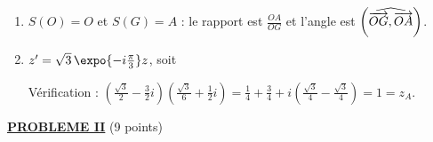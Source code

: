 \begin{description}
\begin{enumerate}
\begin{enumerate}
			\item {}
				$S(O) = O$ et $S(G) = A$ : le rapport est $\frac{OA}{OG}$ et l'angle est $\left( \widehat{ \overrightarrow{OG} , \overrightarrow{OA} } \right)$.
				\par\noindent{}
			\item {}
				$z' = \sqrt{3}\,\expo{-i\frac{\pi}{3}} z$, soit \par\noindent{}
				Vérification : $\left(\frac{\sqrt{3}}{2} - \frac{3}{2}i\right)\left(\frac{\sqrt{3}}{6} + \frac{1}{2}i\right) = \frac{1}{4} + \frac{3}{4} + i\left(\frac{\sqrt{3}}{4} - \frac{\sqrt{3}}{4}\right) = 1 = z_A$.
		\end{enumerate}
	\end{enumerate}
\end{description}
\noindent \underline{\textsc{\textbf{PROBLEME II}}} (9 points)
